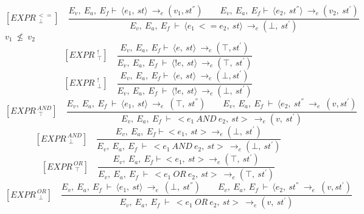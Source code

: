 \[	
[EXPR^{\ <=}_{\ \ \bot}] \quad	
\dfrac{E_v, \ E_a, \ E_f \vdash \ \langle e_1, \ st \rangle \ \rightarrow_e (v_1, st^{''}) \qquad E_v, \ E_a, \ E_f \vdash \ \langle e_2, \ st^{''} \rangle \ \rightarrow_e (v_2, \ st^{'})}{E_v, \ E_a, \ E_f \ \vdash \ \langle e_1 \ <= e_2, \ st \rangle \ \rightarrow_e (\bot, \ st^{'})}	
\]
\begin{math}		
	v_1 \ \nleq \ v_2		
\end{math}
\[	
[EXPR^{\ \ !}_{\ \ \top}] \quad	
\dfrac{E_v, \ E_a, \ E_f \vdash \ \langle e, \ st \rangle \ \rightarrow_e (\top, st^{'})}{E_v, \ E_a, \ E_f \ \vdash \ \langle !e, \ st \rangle \ \rightarrow_e (\top, \ st^{'})}	
\] \newline
\[	
[EXPR^{\ \ !}_{\ \ \bot}] \quad	
\dfrac{E_v, \ E_a, \ E_f \vdash \ \langle e, \ st \rangle \ \rightarrow_e (\bot, st^{'})}{E_v, \ E_a, \ E_f \ \vdash \ \langle !e, \ st \rangle \ \rightarrow_e (\bot, \ st^{'})}	
\]\newline
\[	
[EXPR^{\ AND}_{\ \ \top}] \quad	
\dfrac{E_v, \ E_a, \ E_f \ \vdash \ \langle e_1, \ st \rangle \ \rightarrow_e \ (\top, \ st^{''}) \qquad E_v, \ E_a, \ E_f \ \vdash \ \langle e_2, \ st^{''} \ \rightarrow_e \ (v, st^{'})}{E_v, \ E_a, \ E_f \ \vdash \ <e_1 \ AND \ e_2, \ st> \ \rightarrow_e (v, \ st^{'})}	
\] \newline
\[	
[EXPR^{\ AND}_{\ \ \bot}] \quad	
\dfrac{E_v, \ E_a, \ E_f \vdash <e_1, \ st> \rightarrow_e (\bot, \ st^{'}) }{E_v, \ E_a, \ E_f \ \vdash \ <e_1 \ AND \ e_2, \ st> \ \rightarrow_e (\bot, \ st^{'})}	
\]\newline
\[	
[EXPR^{\ OR}_{\ \ \top}] \quad	
\dfrac{E_v, \ E_a, \ E_f \vdash <e_1, \ st> \rightarrow_e (\top, \ st^{'}) }{E_v, \ E_a, \ E_f \ \vdash \ <e_1 \ OR \ e_2, \ st> \ \rightarrow_e (\top, \ st^{'})}	
\]\newline
\[	
[EXPR^{\ OR}_{\ \ \bot}] \quad	
\dfrac{E_v, \ E_a, \ E_f \ \vdash \ \langle e_1, \ st \rangle \ \rightarrow_e \ (\bot, \ st^{''}) \qquad E_v, \ E_a, \ E_f \ \vdash \ \langle e_2, \ st^{''} \ \rightarrow_e \ (v, st^{'})}{E_v, \ E_a, \ E_f \ \vdash \ <e_1 \ OR \ e_2, \ st> \ \rightarrow_e (v, \ st^{'})}
\]